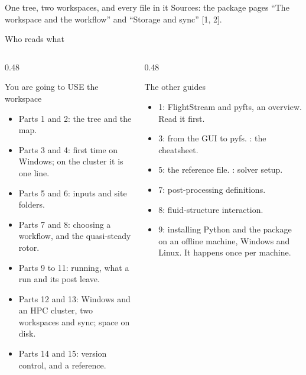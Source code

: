 \documentclass[aspectratio=169,11pt]{beamer}
\begin{document}
  {One tree, two workspaces, and every file in it}
  {Sources: the package pages ``The workspace and the workflow'' and
   ``Storage and sync'' [1, 2].}

\begin{frame}{Who reads what}
\begin{columns}[T]
\begin{column}{0.48\textwidth}
\begin{block}{You are going to USE the workspace}
\begin{itemize}\small
  \item Parts 1 and 2: the tree and the map.
  \item Parts 3 and 4: first time on Windows; on the cluster it is one line.
  \item Parts 5 and 6: inputs and site folders.
  \item Parts 7 and 8: choosing a workflow, and the quasi-steady rotor.
  \item Parts 9 to 11: running, what a run and its post leave.
  \item Parts 12 and 13: Windows and an HPC cluster, two workspaces and sync;
        space on disk.
  \item Parts 14 and 15: version control, and a reference.
\end{itemize}
\end{block}
\end{column}
\begin{column}{0.48\textwidth}
\begin{block}{The other guides}
\begin{itemize}\small
  \item 1: FlightStream and pyfts, an overview. Read it first.
  \item 3: from the GUI to pyfs. : the cheatsheet.
  \item 5: the reference file. : solver setup.
  \item 7: post-processing definitions.
  \item 8: fluid-structure interaction.
  \item 9: installing Python and the package on an offline machine,
        Windows and Linux. It happens once per machine.
\end{itemize}
\end{block}
\end{column}
\end{columns}
\end{frame}
\end{document}
